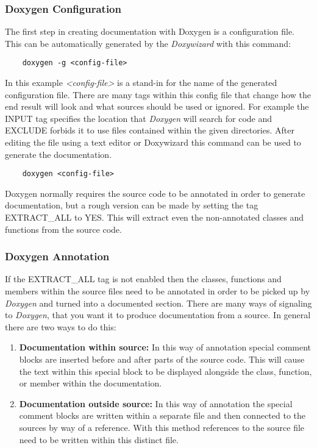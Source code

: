 \subsubsection{Doxygen Configuration}
The first step in creating documentation with Doxygen is a configuration file. This can be automatically generated by the \textit{Doxywizard} with this command:

\begin{verbatim}
    doxygen -g <config-file>
\end{verbatim}

In this example \textit{<config-file>} is a stand-in for the name of the generated configuration file. There are many tags within this config file that change how 
the end result will look and what sources should be used or ignored. For example the INPUT tag specifies the location that \textit{Doxygen} will search for code and
EXCLUDE forbids it to use files contained within the given directories. After editing the file using a text editor or Doxywizard this command can be used to generate 
the documentation.

\begin{verbatim}
    doxygen <config-file>
\end{verbatim}

Doxygen normally requires the source code to be annotated in order to generate documentation, but a rough version can be made by setting the tag EXTRACT\_ALL to YES.
This will extract even the non-annotated classes and functions from the source code.

\subsubsection{Doxygen Annotation}

If the EXTRACT\_ALL tag is not enabled then the classes, functions and members within the source files need to be annotated in order to be picked up by \textit{Doxygen}
and turned into a documented section. There are many ways of signaling to \textit{Doxygen}, that you want it to produce documentation from a source. In general there
are two ways to do this:
\begin{enumerate}
    \item \textbf{Documentation within source:} In this way of annotation special comment blocks are inserted before and after parts of the source code. 
                This will cause the text within this special block to be displayed alongside the class, function, or member within the documentation.
    \item \textbf{Documentation outside source:} In this way of annotation the special comment blocks are written within a separate file and then connected 
                to the sources by way of a reference. With this method references to the source file need to be written within this distinct file.
\end{enumerate}

